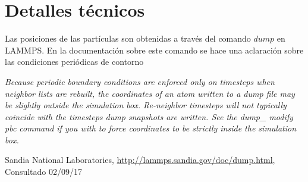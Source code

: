 \documentclass[
 reprint,
 amsmath,amssymb,
 aps,
 a4paper
]{revtex4-1}
\begin{document}
\section{\label{seq:details}Detalles técnicos}
Las posiciones de las partículas son obtenidas a través del comando $dump$ en LAMMPS. En la documentación\cite{dumplammps} sobre este comando se hace una aclaración sobre las condiciones periódicas de contorno
\begin{framed}
\textit{Because periodic boundary conditions are enforced only on timesteps when neighbor lists are rebuilt, the coordinates of an atom written to a dump file may be slightly outside the simulation box. Re-neighbor timesteps will not typically coincide with the timesteps dump snapshots are written. See the dump\_ modify pbc command if you with to force coordinates to be strictly inside the simulation box.}
\end{framed}


\begin{thebibliography}{9}

  Sandia National Laboratories,
  \url{http://lammps.sandia.gov/doc/dump.html},
  Consultado 02/09/17

\end{thebibliography}
\end{document}
